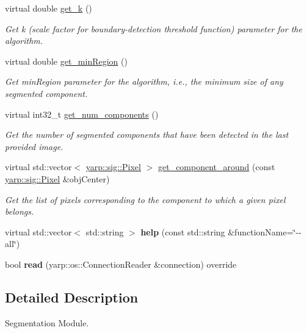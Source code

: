 \begin{DoxyCompactItemize}
virtual double \hyperlink{classGBSegmModule_a44bab99aa7a035e57a185673c040d2f6}{get\+\_\+k} ()
\begin{DoxyCompactList}\small\item\em Get k (scale factor for boundary-\/detection threshold function) parameter for the algorithm. \end{DoxyCompactList}\item 
virtual double \hyperlink{classGBSegmModule_a2378b95e60b406a119947aa86b5bb9c4}{get\+\_\+min\+Region} ()
\begin{DoxyCompactList}\small\item\em Get min\+Region parameter for the algorithm, i.\+e., the minimum size of any segmented component. \end{DoxyCompactList}\item 
virtual int32\+\_\+t \hyperlink{classGBSegmModule_a655ee7c895eed07b07099133b9d8ce68}{get\+\_\+num\+\_\+components} ()
\begin{DoxyCompactList}\small\item\em Get the number of segmented components that have been detected in the last provided image. \end{DoxyCompactList}\item 
virtual std\+::vector$<$ \hyperlink{classyarp_1_1sig_1_1Pixel}{yarp\+::sig\+::\+Pixel} $>$ \hyperlink{classGBSegmModule_a0b63c53513e67c4f126e29cf7f28ad53}{get\+\_\+component\+\_\+around} (const \hyperlink{classyarp_1_1sig_1_1Pixel}{yarp\+::sig\+::\+Pixel} \&obj\+Center)
\begin{DoxyCompactList}\small\item\em Get the list of pixels corresponding to the component to which a given pixel belongs. \end{DoxyCompactList}\item 
\mbox{\label{classyarp_1_1sig_1_1SegmentationModuleInterface_a14ea1dff9efc91a5099633740b3e45f9}} 
virtual std\+::vector$<$ std\+::string $>$ {\bfseries help} (const std\+::string \&function\+Name=\char`\"{}-\/-\/all\char`\"{})
\item 
\mbox{\label{classyarp_1_1sig_1_1SegmentationModuleInterface_a31d3ce62c3ad4ab669216a19cde4e769}} 
bool {\bfseries read} (yarp\+::os\+::\+Connection\+Reader \&connection) override
\end{DoxyCompactItemize}


\subsection{Detailed Description}
Segmentation Module. 



